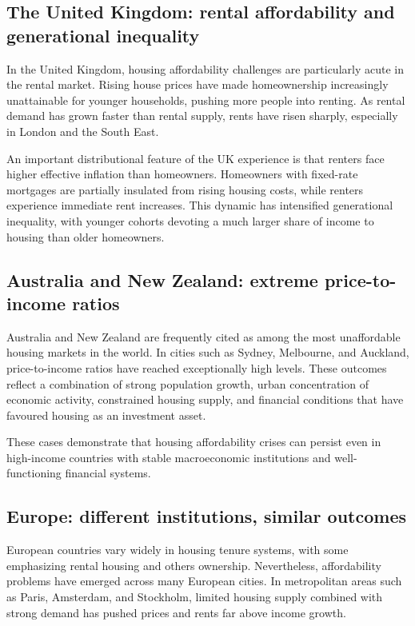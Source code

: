 \documentclass[11pt]{article}
\begin{document}
\subsection*{The United Kingdom: rental affordability and generational inequality}

In the United Kingdom, housing affordability challenges are particularly acute in the rental market. Rising house prices have made homeownership increasingly unattainable for younger households, pushing more people into renting. As rental demand has grown faster than rental supply, rents have risen sharply, especially in London and the South East.

An important distributional feature of the UK experience is that renters face higher effective inflation than homeowners. Homeowners with fixed-rate mortgages are partially insulated from rising housing costs, while renters experience immediate rent increases. This dynamic has intensified generational inequality, with younger cohorts devoting a much larger share of income to housing than older homeowners.

\subsection*{Australia and New Zealand: extreme price-to-income ratios}

Australia and New Zealand are frequently cited as among the most unaffordable housing markets in the world. In cities such as Sydney, Melbourne, and Auckland, price-to-income ratios have reached exceptionally high levels. These outcomes reflect a combination of strong population growth, urban concentration of economic activity, constrained housing supply, and financial conditions that have favoured housing as an investment asset.

These cases demonstrate that housing affordability crises can persist even in high-income countries with stable macroeconomic institutions and well-functioning financial systems.

\subsection*{Europe: different institutions, similar outcomes}

European countries vary widely in housing tenure systems, with some emphasizing rental housing and others ownership. Nevertheless, affordability problems have emerged across many European cities. In metropolitan areas such as Paris, Amsterdam, and Stockholm, limited housing supply combined with strong demand has pushed prices and rents far above income growth.
\end{document}
